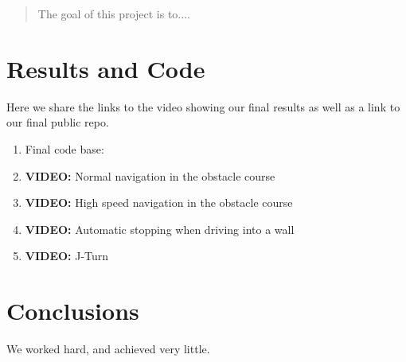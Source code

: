 \documentclass[12pt]{article}
\begin{document}
\maketitle

\begin{abstract}
The goal of this project is to....
\end{abstract}











% 

% 

\section{Results and Code}\label{results}
Here we share the links to the video showing our final results as well as a link to our final public repo. 

\begin{enumerate}
	\item Final code base: 
	\item \textbf{VIDEO:} Normal navigation in the obstacle course 
	\item \textbf{VIDEO:} High speed navigation in the obstacle course
	\item \textbf{VIDEO:} Automatic stopping when driving into a wall
	\item \textbf{VIDEO:} J-Turn
\end{enumerate}

\section{Conclusions}\label{conclusions}
We worked hard, and achieved very little.
\end{document}
